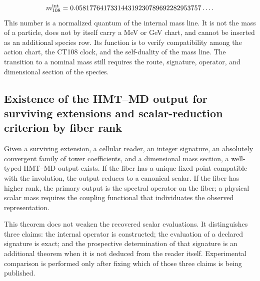 \[
m_{108}^{\rm int}
=0.058177641733144319230789692282953757\ldots .
\]
This number is a normalized quantum of the internal mass line. It is not the mass of a particle, does not by itself carry a MeV or GeV chart, and cannot be inserted as an additional species row. Its function is to verify compatibility among the action chart, the CT108 clock, and the self-duality of the mass line. The transition to a nominal mass still requires the route, signature, operator, and dimensional section of the species.

\subsection{Existence of the HMT--MD output for surviving extensions and scalar-reduction criterion by fiber rank}
Given a surviving extension, a cellular reader, an integer signature, an absolutely convergent family of tower coefficients, and a dimensional mass section, a well-typed HMT--MD output exists. If the fiber has a unique fixed point compatible with the involution, the output reduces to a canonical scalar. If the fiber has higher rank, the primary output is the spectral operator on the fiber; a physical scalar mass requires the coupling functional that individuates the observed representation.

This theorem does not weaken the recovered scalar evaluations. It distinguishes three claims: the internal operator is constructed; the evaluation of a declared signature is exact; and the prospective determination of that signature is an additional theorem when it is not deduced from the reader itself. Experimental comparison is performed only after fixing which of those three claims is being published.

